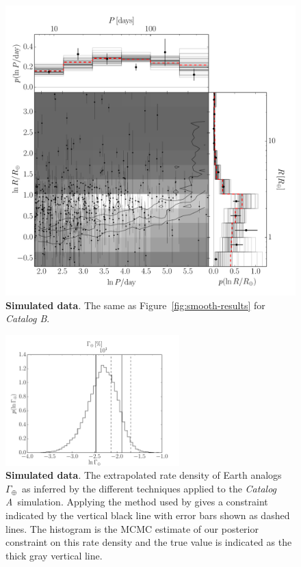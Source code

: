 \documentclass[12pt,preprint]{aastex}
\newcommand{\figref}[1]{\ref{fig:#1}}
\newcommand{\Fig}[1]{Figure~\figref{#1}}
\newcommand{\fig}[1]{\Fig{#1}}
\newcommand{\figlabel}[1]{\label{fig:#1}}
\newcommand{\rate}{\ensuremath{\Gamma}}
\newcommand{\modela}{\emph{Catalog A}}
\newcommand{\modelb}{\emph{Catalog B}}
\newcommand{\gammaearth}{{\ensuremath{\rate_\oplus}}}
\begin{document}
\begin{figure}[p]
\begin{center}
\includegraphics[width=\textwidth]{figures/simulation/results.pdf}
\end{center}
\caption{%
{\bf Simulated data}.
The same as \fig{smooth-results} for \modelb.
\figlabel{simulation-results}}
\end{figure}

\begin{figure}[p]
\begin{center}
\includegraphics[width=0.6\textwidth]{figures/smooth/rate.pdf}
\end{center}
\caption{%
{\bf Simulated data}.
The extrapolated rate density of Earth analogs \gammaearth\ as inferred by the
different techniques applied to the \modela\ simulation.
Applying the method used by \citet{petigura} gives a constraint indicated by
the vertical black line with error bars shown as dashed lines.
The histogram is the MCMC estimate of our posterior constraint on this rate
density and the true value is indicated as the thick gray vertical line.
\figlabel{smooth-rate}}
\end{figure}
\end{document}
